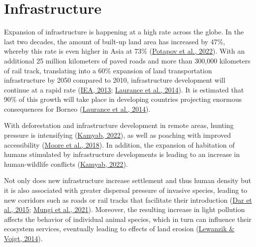 \documentclass[
  letterpaper,
  DIV=11,
  numbers=noendperiod]{scrreprt}
\begin{document}
\hypertarget{sec-infrastructure}{%
\section{Infrastructure}\label{sec-infrastructure}}

Expansion of infrastructure is happening at a high rate across the
globe. In the last two decades, the amount of built-up land area has
increased by 47\%, whereby this rate is even higher in Asia at 73\%
(\protect\hyperlink{ref-potapovGlobal20002020Land2022}{Potapov et al.,
2022}). With an additional 25 million kilometers of paved roads and more
than 300,000 kilometers of rail track, translating into a 60\% expansion
of land transportation infrastructure by 2050 compared to 2010,
infrastructure development will continue at a rapid rate
(\protect\hyperlink{ref-ieaGlobalLandTransport2013}{IEA, 2013};
\protect\hyperlink{ref-lauranceGlobalStrategyRoad2014}{Laurance et al.,
2014}). It is estimated that 90\% of this growth will take place in
developing countries projecting enormous consequences for Borneo
(\protect\hyperlink{ref-lauranceGlobalStrategyRoad2014}{Laurance et al.,
2014}).

With deforestation and infrastructure development in remote areas,
hunting pressure is intensifying
(\protect\hyperlink{ref-kamyabElaeisGuineensis2022}{Kamyab, 2022}), as
well as poaching with improved accessibility
(\protect\hyperlink{ref-mooreAreRangerPatrols2018}{Moore et al., 2018}).
In addition, the expansion of habitation of humans stimulated by
infrastructure developments is leading to an increase in human-wildlife
conflicts (\protect\hyperlink{ref-kamyabElaeisGuineensis2022}{Kamyab,
2022}).

Not only does new infrastructure increase settlement and thus human
density but it is also associated with greater dispersal pressure of
invasive species, leading to new corridors such as roads or rail tracks
that facilitate their introduction
(\protect\hyperlink{ref-darRoadsActCorridors2015}{Dar et al., 2015};
\protect\hyperlink{ref-mungiRoleSpeciesRichness2021}{Mungi et al.,
2021}). Moreover, the resulting increase in light pollution affects the
behavior of individual animal species, which in turn can influence their
ecosystem services, eventually leading to effects of land erosion
(\protect\hyperlink{ref-lewanzikArtificialLightPuts2014}{Lewanzik \&
Voigt, 2014}).
\end{document}
